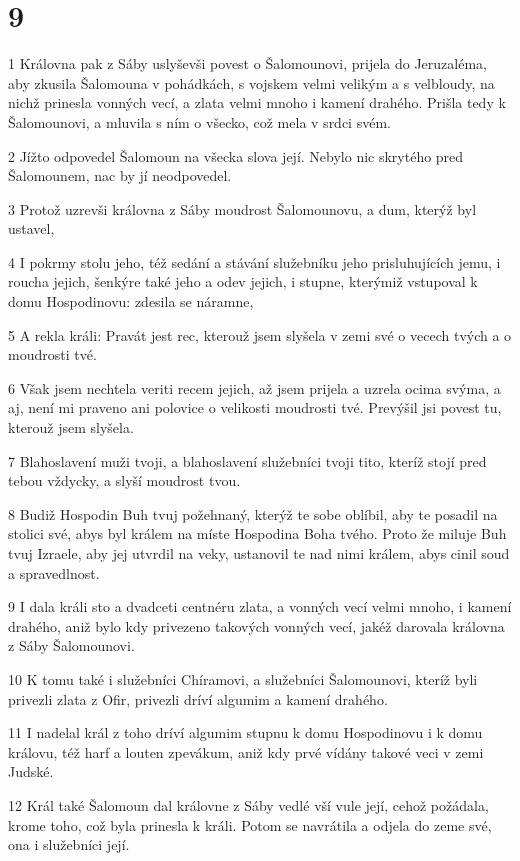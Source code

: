 \chapter{9}

\par 1 Královna pak z Sáby uslyševši povest o Šalomounovi, prijela do Jeruzaléma, aby zkusila Šalomouna v pohádkách, s vojskem velmi velikým a s velbloudy, na nichž prinesla vonných vecí, a zlata velmi mnoho i kamení drahého. Prišla tedy k Šalomounovi, a mluvila s ním o všecko, což mela v srdci svém.
\par 2 Jížto odpovedel Šalomoun na všecka slova její. Nebylo nic skrytého pred Šalomounem, nac by jí neodpovedel.
\par 3 Protož uzrevši královna z Sáby moudrost Šalomounovu, a dum, kterýž byl ustavel,
\par 4 I pokrmy stolu jeho, též sedání a stávání služebníku jeho prisluhujících jemu, i roucha jejich, šenkýre také jeho a odev jejich, i stupne, kterýmiž vstupoval k domu Hospodinovu: zdesila se náramne,
\par 5 A rekla králi: Pravát jest rec, kterouž jsem slyšela v zemi své o vecech tvých a o moudrosti tvé.
\par 6 Však jsem nechtela veriti recem jejich, až jsem prijela a uzrela ocima svýma, a aj, není mi praveno ani polovice o velikosti moudrosti tvé. Prevýšil jsi povest tu, kterouž jsem slyšela.
\par 7 Blahoslavení muži tvoji, a blahoslavení služebníci tvoji tito, kteríž stojí pred tebou vždycky, a slyší moudrost tvou.
\par 8 Budiž Hospodin Buh tvuj požehnaný, kterýž te sobe oblíbil, aby te posadil na stolici své, abys byl králem na míste Hospodina Boha tvého. Proto že miluje Buh tvuj Izraele, aby jej utvrdil na veky, ustanovil te nad nimi králem, abys cinil soud a spravedlnost.
\par 9 I dala králi sto a dvadceti centnéru zlata, a vonných vecí velmi mnoho, i kamení drahého, aniž bylo kdy privezeno takových vonných vecí, jakéž darovala královna z Sáby Šalomounovi.
\par 10 K tomu také i služebníci Chíramovi, a služebníci Šalomounovi, kteríž byli privezli zlata z Ofir, privezli dríví algumim a kamení drahého.
\par 11 I nadelal král z toho dríví algumim stupnu k domu Hospodinovu i k domu královu, též harf a louten zpevákum, aniž kdy prvé vídány takové veci v zemi Judské.
\par 12 Král také Šalomoun dal královne z Sáby vedlé vší vule její, cehož požádala, krome toho, což byla prinesla k králi. Potom se navrátila a odjela do zeme své, ona i služebníci její.
